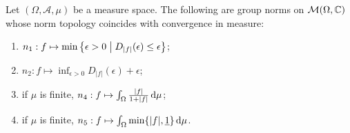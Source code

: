\begin{lemma}
Let $(\Omega, \mathcal{A}, \mu)$ be a measure space. The following are group norms on $\operatorname{\mathcal{M}}(\Omega, \mathbb{C})$ whose norm topology coincides with convergence in measure:
\begin{enumerate}
\item $n_1: f \mapsto \min\setbuilder[\big]{\epsilon > 0}{D_{|f|}(\epsilon) \leq \epsilon}$;
\item $n_2: f \mapsto \inf_{\epsilon>0} D_{|f|}(\epsilon) + \epsilon$;
\item if $\mu$ is finite, $n_4: f \mapsto \int_\Omega \frac{|f|}{1+|f|}\operatorname{d \!}{\mu}$;
\item if $\mu$ is finite, $n_5: f \mapsto \int_\Omega\min\{|f|, \underline{1}\}\operatorname{d \!}{\mu}$.
\end{enumerate}
\end{lemma}
